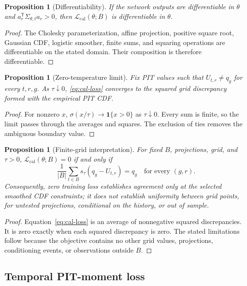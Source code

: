 \documentclass[11pt]{article}
\newtheorem{proposition}[definition]{Proposition}
\newcommand{\ind}{\mathbf{1}}
\begin{document}
\begin{proposition}[Differentiability]
If the network outputs are differentiable in $\theta$ and
$a_r^{\mathsf T}\Sigma_{\theta,t}a_r>0$, then
$\mathcal L_{\mathrm{cal}}(\theta;B)$ is differentiable in $\theta$.
\end{proposition}

\begin{proof}
The Cholesky parameterization, affine projection, positive square root, Gaussian
CDF, logistic smoother, finite sums, and squaring operations are differentiable on
the stated domain. Their composition is therefore differentiable.
\end{proof}

\begin{proposition}[Zero-temperature limit]
Fix PIT values such that $U_{t,r}\neq q_g$ for every $t,r,g$. As
$\tau\downarrow0$, \eqref{eq:cal-loss} converges to the squared grid discrepancy
formed with the empirical PIT CDF.
\end{proposition}

\begin{proof}
For nonzero $x$, $\sigma(x/\tau)\to\ind\{x>0\}$ as $\tau\downarrow0$. Every sum
is finite, so the limit passes through the averages and squares. The exclusion of
ties removes the ambiguous boundary value.
\end{proof}

\begin{proposition}[Finite-grid interpretation]
For fixed $B$, projections, grid, and $\tau>0$,
$\mathcal L_{\mathrm{cal}}(\theta;B)=0$ if and only if
\[
 \frac{1}{|B|}\sum_{t\in B}s_\tau(q_g-U_{t,r})=q_g
 \quad\text{for every }(g,r).
\]
Consequently, zero training loss establishes agreement only at the selected
smoothed CDF constraints; it does not establish uniformity between grid points,
for untested projections, conditional on the history, or out of sample.
\end{proposition}

\begin{proof}
Equation~\eqref{eq:cal-loss} is an average of nonnegative squared discrepancies.
It is zero exactly when each squared discrepancy is zero. The stated limitations
follow because the objective contains no other grid values, projections,
conditioning events, or observations outside $B$.
\end{proof}

\subsection{Temporal PIT-moment loss}
\end{document}
